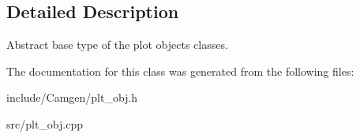 \subsection{Detailed Description}
Abstract base type of the plot objects classes. 

The documentation for this class was generated from the following files\+:\begin{DoxyCompactItemize}
\item 
include/\+Camgen/plt\+\_\+obj.\+h\item 
src/plt\+\_\+obj.\+cpp\end{DoxyCompactItemize}
